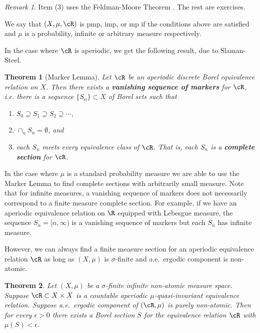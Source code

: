 \documentclass[12pt]{article}
\theoremstyle{plain}
\newtheorem{thm}{Theorem}[section]
\theoremstyle{definition}
\theoremstyle{remark}
\newtheorem{remark}{Remark}
\newcommand{\eps}{\epsilon}
\begin{document}
\begin{remark}
     Item (3) uses the Feldman-Moore Theorem \cite{MR0578656}. The rest are exercises.
\end{remark}

We say that $(X,\mu,\cR)$ is pmp, imp, or mp if the conditions above are satisfied and $\mu$ is a probability, infinite or arbitrary measure respectively.




In the case where $\cR$ is aperiodic, we get the following result, due to Slaman-Steel.

\begin{thm}[Marker Lemma]\label{marker}
    Let $\cR$ be an aperiodic discrete Borel equivalence relation on $X$. Then there exists a \textbf{vanishing sequence of markers} for $\cR$, i.e. there is a sequence $\{S_n\} \subset X$ of Borel sets such that 
    \begin{enumerate} \itemsep0em
        \item $S_0 \supseteq S_1 \supseteq S_2 \supseteq \cdots$,
        \item $\cap_n S_n = \emptyset$, and
        \item each $S_n$ meets every equivalence class of $\cR$. That is, each $S_n$ is a \textbf{complete section} for $\cR$. 
    \end{enumerate}
\end{thm}

In the case where $\mu$ is a standard probability measure we are able to use the Marker Lemma to find complete sections with arbitrarily small measure.
Note that for infinite measures, a vanishing sequence of markers does not necessarily correspond to a finite measure complete section. For example, if we have an aperiodic equivalence relation on $\R$ equipped with Lebesgue measure, the sequence $S_n = [n, \infty)$ is a vanishing sequence of markers but each $S_n$ has infinite measure. 

However, we can always find a finite measure section for an aperiodic equivalence relation $\cR$ as long as $(X, \mu)$ is $\sigma$-finite and a.e.\ ergodic component is non-atomic.

\begin{thm}\label{T:section}
    Let $(X,\mu)$ be a $\sigma$-finite infinite non-atomic measure space. Suppose $\cR \subset X \times X$ is a countable aperiodic $\mu$-quasi-invariant equivalence relation. Suppose a.e.\ ergodic component of $(\cR,\mu)$ is purely non-atomic. Then for every $\eps>0$ there exists a Borel section $S$ for the equivalence relation $\cR$ with $\mu(S) < \eps$.%
\end{thm}
\end{document}
